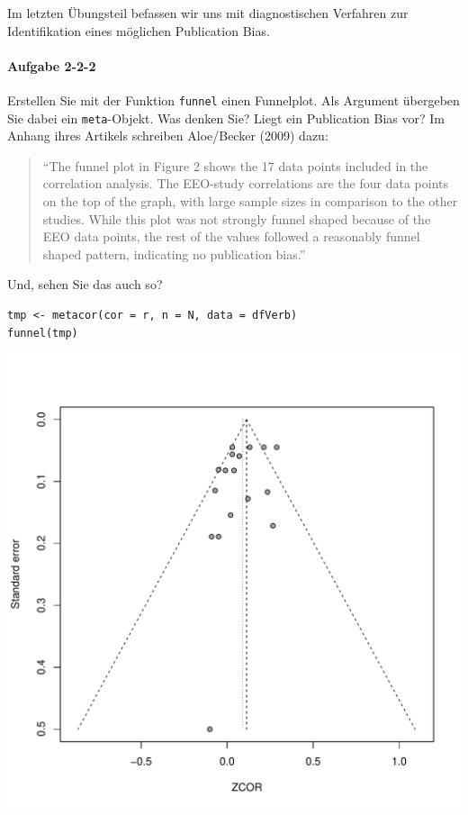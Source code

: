 \documentclass[normalheadings, 10pt]{scrartcl}\usepackage{graphicx, color}
\makeatletter
\def\maxwidth{ %
  \ifdim\Gin@nat@width>\linewidth
    \linewidth
  \else
    \Gin@nat@width
  \fi
}
\newenvironment{kframe}{%
 \def\at@end@of@kframe{}%
 \ifinner\ifhmode%
  \def\at@end@of@kframe{\end{minipage}}%
  \begin{minipage}{\columnwidth}%
 \fi\fi%
 \def\FrameCommand##1{\hskip\@totalleftmargin \hskip-\fboxsep
 \colorbox{shadecolor}{##1}\hskip-\fboxsep
     \hskip-\linewidth \hskip-\@totalleftmargin \hskip\columnwidth}%
 \MakeFramed {\advance\hsize-\width
   \@totalleftmargin\z@ \linewidth\hsize
   \@setminipage}}%
 {\par\unskip\endMakeFramed%
 \at@end@of@kframe}
\newenvironment{knitrout}{}{} %
\newcommand{\code}[1]{\texttt{#1}}
\makeatother
\begin{document}
Im letzten Übungsteil befassen wir uns mit diagnostischen Verfahren zur
Identifikation eines möglichen Publication Bias.

\paragraph{Aufgabe 2-2-2}  Erstellen Sie mit der Funktion \code{funnel} einen Funnelplot. Als
  Argument übergeben Sie dabei ein \code{meta}-Objekt. Was denken Sie? Liegt ein
  Publication Bias vor? Im Anhang ihres Artikels schreiben Aloe/Becker (2009) dazu:

  \begin{quote}
    \enquote{The funnel plot in Figure 2 shows the 17 data points included in the correlation analysis.
      The EEO-study correlations are the four data points on the top of the graph, with large sample
      sizes in comparison to the other studies.  While this plot was not strongly funnel shaped because
      of the EEO data points, the rest of the values followed a reasonably funnel shaped pattern,
      indicating no publication bias.}
  \end{quote}

  Und, sehen Sie das auch so?

\pagebreak  
  
\begin{rbsp}
\begin{knitrout}
\color{fgcolor}\begin{kframe}
\begin{verbatim}
tmp <- metacor(cor = r, n = N, data = dfVerb)
funnel(tmp)
\end{verbatim}
\end{kframe}
\includegraphics[width=\maxwidth]{fig/assign-2-2-2_1} 

\end{knitrout}

\end{rbsp}
\end{document}
